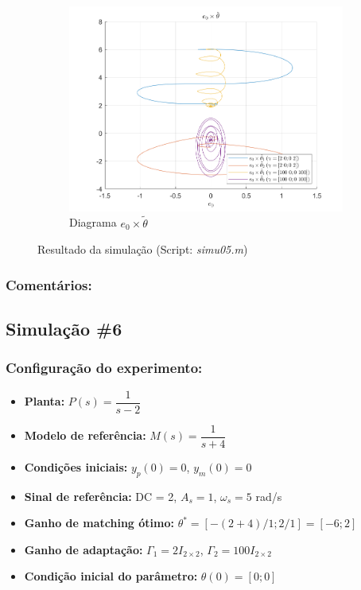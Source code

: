 \documentclass[10pt]{article}
\begin{document}
\begin{figure}[h!]
    \begin{subfigure}[b]{0.35\textwidth}
        \centering
        \includegraphics[width=\textwidth]{img/fig05d.png}
        \caption{Diagrama $e_0 \times \tilde{\theta}$}
    \end{subfigure}

    \caption{Resultado da simulação (Script: \textit{simu05.m})}
    \label{fig:sim5}
\end{figure}

\subsubsection{Comentários:}

\newpage

\subsection{Simulação \#6}
\subsubsection{Configuração do experimento:}
\begin{itemize}
\item \textbf{Planta:} $P(s) = \dfrac{1}{s - 2}$
\item \textbf{Modelo de referência:} $M(s) = \dfrac{1}{s + 4}$
\item \textbf{Condições iniciais:} $y_p(0)=0$, $y_m(0)=0$
\item \textbf{Sinal de referência:} DC = 2, $A_s=1$, $\omega_s=5$ rad/s
\item \textbf{Ganho de matching ótimo:} $\theta^* = [-(2+4)/1;2/1] = [-6;2]$
\item \textbf{Ganho de adaptação:} $\Gamma_1 = 2I_{2\times2}$, $\Gamma_2 = 100I_{2\times2}$
\item \textbf{Condição inicial do parâmetro:} $\theta(0) = [0;0]$
\end{itemize}
\end{document}
